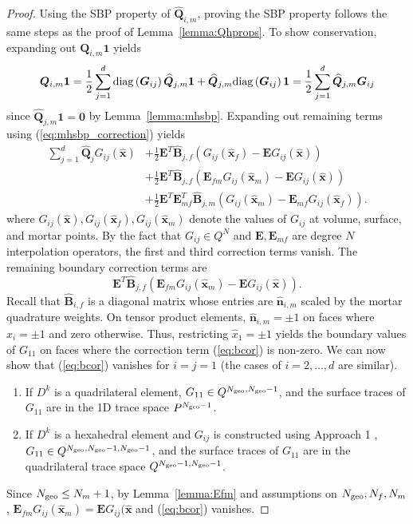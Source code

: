 \documentclass{svjour3}                     %
\renewcommand{\hat}{\widehat}
\newcommand{\diag}[1]{{\rm diag}\LRp{#1}}
\newcommand{\LRp}[1]{\left( #1 \right)}
\begin{document}
\begin{proof}
Using the SBP property of $\hat{\bm{Q}}_{i,m}$, proving the SBP property follows the same steps as the proof of Lemma~\ref{lemma:Qhprops}.  To show conservation, expanding out $\bm{Q}_{i,m}\bm{1} $ yields
\[
\bm{Q}_{i,m}\bm{1} = \frac{1}{2}\sum_{j=1}^d \diag{\bm{G}_{ij}}\hat{\bm{Q}}_{j,m}\bm{1} + \hat{\bm{Q}}_{j,m} \diag{\bm{G}_{ij}}\bm{1} = \frac{1}{2}\sum_{j=1}^d\hat{\bm{Q}}_{j,m} \bm{G}_{ij}
\]
since $\hat{\bm{Q}}_{j,m}\bm{1} = \bm{0}$ by Lemma~\ref{lemma:mhsbp}.  Expanding out remaining terms using (\ref{eq:mhsbp_correction}) yields
\begin{align*}
\sum_{j=1}^d \hat{\bm{Q}}_j G_{ij}(\hat{\bm{x}}) &+ \frac{1}{2} \bm{E}^T\hat{\bm{B}}_{j,f}\LRp{G_{ij}(\hat{\bm{x}}_f) - \bm{E}G_{ij}(\hat{\bm{x}})} \\
&+ \frac{1}{2} \bm{E}^T\hat{\bm{B}}_{j,f}\LRp{\bm{E}_{fm}G_{ij}(\hat{\bm{x}}_m) - \bm{E}G_{ij}(\hat{\bm{x}})} \\
&+ \frac{1}{2} \bm{E}^T\bm{E}_{mf}^T\hat{\bm{B}}_{j,m}\LRp{G_{ij}(\hat{\bm{x}}_m) - \bm{E}_{mf}G_{ij}(\hat{\bm{x}}_f)}.
\end{align*}
where $G_{ij}(\hat{\bm{x}}), G_{ij}(\hat{\bm{x}}_f), G_{ij}(\hat{\bm{x}}_m)$ denote the values of $G_{ij}$ at volume, surface, and mortar points.  By the fact that $G_{ij} \in Q^N$ and $\bm{E}, \bm{E}_{mf}$ are degree $N$ interpolation operators, the first and third correction terms vanish.  The remaining boundary correction terms are
\begin{equation}
\bm{E}^T\hat{\bm{B}}_{j,f}\LRp{\bm{E}_{fm}G_{ij}(\hat{\bm{x}}_m) - \bm{E}G_{ij}(\hat{\bm{x}})}.  
\label{eq:bcor}
\end{equation}
Recall that $\hat{\bm{B}}_{i,f}$ is a diagonal matrix whose entries are $\hat{\bm{n}}_{i,m}$ scaled by the mortar quadrature weights.  On tensor product elements, $\hat{\bm{n}}_{i,m}=\pm 1$ on faces where $\hat{x}_i = \pm 1$ and zero otherwise.  Thus, restricting $\hat{x}_1 = \pm 1$ yields the boundary values of $G_{11}$ on faces where the correction term (\ref{eq:bcor}) is non-zero.  We can now show that (\ref{eq:bcor}) vanishes for $i = j = 1$ (the cases of $i = 2,\ldots,d$ are similar).  
\begin{enumerate}
\item If $D^k$ is a quadrilateral element, $G_{11} \in Q^{N_{\rm geo},N_{\rm geo}-1}$, and the surface traces of $G_{11}$ are in the 1D trace space $P^{N_{\rm geo}-1}$.  
\item If $D^k$ is a hexahedral element and $G_{ij}$ is constructed using Approach 1 \cite{kozdon2018energy}, $G_{11} \in Q^{N_{\rm geo}, N_{\rm geo}-1,N_{\rm geo}-1}$, and the surface traces of $G_{11}$ are in the quadrilateral trace space $Q^{N_{\rm geo}-1,N_{\rm geo}-1}$.  
\end{enumerate}
Since $N_{\rm geo} \leq N_m+1$, by Lemma~\ref{lemma:Efm} and assumptions on $N_{\rm geo}, N_f, N_m$, $\bm{E}_{fm}G_{ij}(\hat{\bm{x}}_m) = \bm{E}G_{ij}(\hat{\bm{x}}$ and (\ref{eq:bcor}) vanishes.  


\end{proof}
\end{document}
